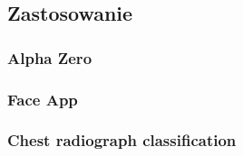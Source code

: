   \subsection{Zastosowanie}

    \subsubsection{Alpha Zero}

    \subsubsection{Face App}

    \subsubsection{Chest radiograph classification}
